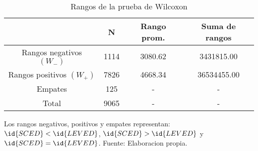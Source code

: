 \begin{table}[H]
\centering
\begin{tabular}{c|c|c|c|}
\cline{2-4}
                                       & N    & Rango prom. & Suma de rangos \\ \hline
\multicolumn{1}{|c|}{Rangos negativos $(W_{-})$} & 1114 & 3080.62     & 3431815.00     \\ \hline
\multicolumn{1}{|c|}{Rangos positivos $(W_{+})$} & 7826 & 4668.34     & 36534455.00    \\ \hline
\multicolumn{1}{|c|}{Empates}          & 125 & -           & -              \\ \hline
\multicolumn{1}{|c|}{Total}            & 9065 & -           & -              \\ \hline
\end{tabular}
\caption{Rangos de la prueba de Wilcoxon}
Los rangos negativos, positivos y empates representan: $\id{SCED}<\id{LEVED}$, $\id{SCED}>\id{LEVED}$ y $\id{SCED}=\id{LEVED}$.
Fuente: Elaboracion propia.
\label{rangTable}
\end{table}
